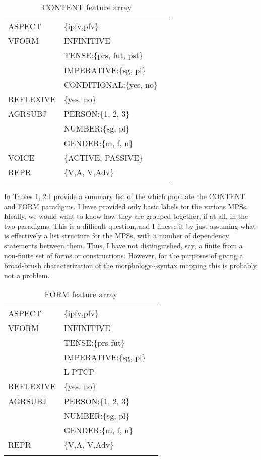 \documentclass[output=paper,
modfonts
]{LSP/langsci}
\begin{document}
\begin{table}[ht]

\begin{tabular}{lll}\lsptoprule

ASPECT		&\{ipfv,pfv\}\\
VFORM	&INFINITIVE\\
		&TENSE:\{prs, fut, pst\}\\
		&IMPERATIVE:\{sg, pl\}\\
		&CONDITIONAL:\{yes, no\}\\
REFLEXIVE	&\{yes, no\}\\
AGRSUBJ	&PERSON:\{1, 2, 3\}\\
		&NUMBER:\{sg, pl\}\\
		&GENDER:\{m, f, n\}\\	
VOICE	&\{ACTIVE, PASSIVE\}\\ 
REPR	&\{\lab V,A\rab, \lab V,Adv\rab\}\\
\lspbottomrule

\end{tabular}

\caption{CONTENT feature array}
\label{table:fsets:CONTENT}
\end{table}%
  
   

In  Tables  \ref{table:fsets:CONTENT}, \ref{table:fsets:FORM} I provide a summary list of the  which populate the CONTENT and FORM paradigms. %
I have provided only basic labels for the various MPSs. Ideally, we would want to know how they are grouped together, if at all, in the two paradigms. This is a difficult question, and I finesse it by just assuming what is effectively a list structure for the MPSs, with a number of dependency statements between them. Thus, I have not distinguished, say, a finite from a non-finite set of forms or constructions. However, for the purposes of giving a broad-brush characterization of the morphology$\sim$syntax mapping this is probably not a problem. 
 

\begin{table}

\begin{tabular}{lll}	\lsptoprule
ASPECT		&\{ipfv,pfv\}\\		
VFORM	&INFINITIVE\\
		&TENSE:\{prs-fut\}\\
		&IMPERATIVE:\{sg, pl\}\\
		&L-PTCP\\
REFLEXIVE	&\{yes, no\}\\
AGRSUBJ	&PERSON:\{1, 2, 3\}\\
		&NUMBER:\{sg, pl\}\\
		&GENDER:\{m, f, n\}\\	
REPR	&\{\lab V,A\rab, \lab V,Adv\rab\}\\
\lspbottomrule
\end{tabular}
\caption{FORM feature array} 
\label{table:fsets:FORM}

\end{table}
\end{document}
